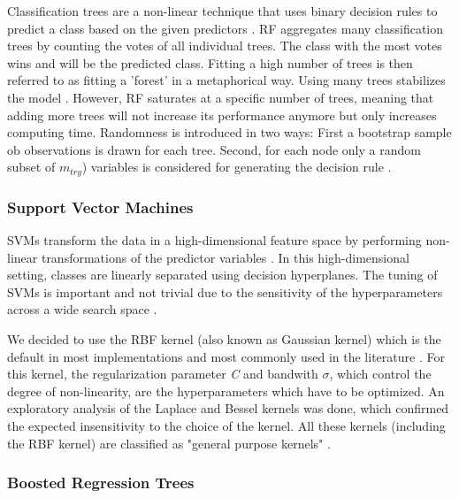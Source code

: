 \documentclass[review]{elsarticle}
\begin{document}
Classification trees are a non-linear technique that uses binary decision rules to predict a class based on the given predictors \citep{Gordon1984}.
\ac{RF} aggregates many classification trees by counting the votes of all individual trees.
The class with the most votes wins and will be the predicted class.
Fitting a high number of trees is then referred to as fitting a 'forest' in a metaphorical way.
Using many trees stabilizes the model \citep{Breiman2001}.
However, \ac{RF} saturates at a specific number of trees, meaning that adding more trees will not increase its performance anymore but only increases computing time.
Randomness is introduced in two ways:
First a bootstrap sample ob observations is drawn for each tree.
Second, for each node only a random subset of \texttt{$m_{try}$}) variables is considered for generating the decision rule \citep{Breiman2001}.

\subsubsection{Support Vector Machines}

\ac{SVM}s transform the data in a high-dimensional feature space by performing non-linear transformations of the predictor variables \citep{Vapnik1998}.
In this high-dimensional setting, classes are linearly separated using decision hyperplanes.
The tuning of \ac{SVM}s is important and not trivial due to the sensitivity of the hyperparameters across a wide search space \citep{Duan2003}.

We decided to use the \ac{RBF} kernel (also known as Gaussian kernel) which is the default in most implementations and most commonly used in the literature \citep{e1071, Guo2005, Pradhan2013}.
For this kernel, the regularization parameter \textit{C} and bandwith $\sigma$, which control the degree of non-linearity, are the hyperparameters which have to be optimized.
An exploratory analysis of the Laplace and Bessel kernels was done, which confirmed the expected insensitivity to the choice of the kernel.
All these kernels (including the \ac{RBF} kernel) are classified as "general purpose kernels" \citep{kernlab}.

\subsubsection{Boosted Regression Trees}
\end{document}
